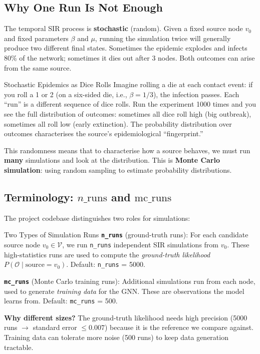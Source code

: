\subsection{Why One Run Is Not Enough}

The temporal SIR process is \textbf{stochastic} (random). Given a fixed source node $v_0$ and fixed parameters $\beta$ and $\mu$, running the simulation twice will generally produce two different final states. Sometimes the epidemic explodes and infects 80\% of the network; sometimes it dies out after 3 nodes. Both outcomes can arise from the same source.

\begin{analogybox}{Stochastic Epidemics as Dice Rolls}
Imagine rolling a die at each contact event: if you roll a 1 or 2 (on a six-sided die, i.e., $\beta = 1/3$), the infection passes. Each ``run'' is a different sequence of dice rolls. Run the experiment 1000 times and you see the full distribution of outcomes: sometimes all dice roll high (big outbreak), sometimes all roll low (early extinction). The probability distribution over outcomes characterises the source's epidemiological ``fingerprint.''
\end{analogybox}

This randomness means that to characterise how a source behaves, we must run \textbf{many} simulations and look at the distribution. This is \textbf{Monte Carlo simulation}: using random sampling to estimate probability distributions.

\subsection{Terminology: $n\_\text{runs}$ and $\text{mc\_runs}$}

The project codebase distinguishes two roles for simulations:

\begin{conceptbox}{Two Types of Simulation Runs}
\textbf{\texttt{n\_runs}} (ground-truth runs): For each candidate source node $v_0 \in \mathcal{V}$, we run \texttt{n\_runs} independent SIR simulations from $v_0$. These high-statistics runs are used to compute the \emph{ground-truth likelihood} $P(\mathcal{O} \mid \text{source} = v_0)$. Default: \texttt{n\_runs} = 5000.

\medskip
\textbf{\texttt{mc\_runs}} (Monte Carlo training runs): Additional simulations run from each node, used to generate \emph{training data} for the GNN. These are observations the model learns from. Default: \texttt{mc\_runs} = 500.

\medskip
\textbf{Why different sizes?} The ground-truth likelihood needs high precision (5000 runs $\to$ standard error $\leq 0.007$) because it is the reference we compare against. Training data can tolerate more noise (500 runs) to keep data generation tractable.
\end{conceptbox}

